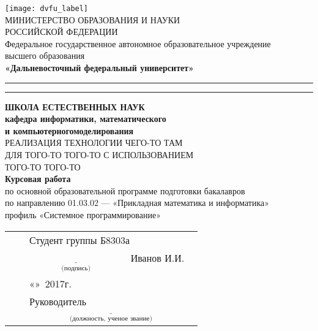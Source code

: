\hfill
\begin{center}
  \hfill \break
  \texttt{[image: dvfu\_label]}\\
  \large{МИНИСТЕРСТВО ОБРАЗОВАНИЯ И НАУКИ}\\
  \large{РОССИЙСКОЙ ФЕДЕРАЦИИ}\\
  \normalsize{Федеральное государственное автономное образовательное учреждение}\\
  \normalsize{высшего образования}\\
  \normalsize{\textbf{«Дальневосточный федеральный университет»}}\\
  \hfill \break
  \rule[0.0cm]{1\linewidth}{0.1cm}
  \rule[0.6cm]{1\linewidth}{0.05cm}
  \hfill \break
  \normalsize{\textbf{ШКОЛА ЕСТЕСТВЕННЫХ НАУК}}\\
  \normalsize{\textbf{кафедра информатики, математического\\ и компьютерногомоделирования}}\\
  \hfill \break
  \hfill \break
  \large{РЕАЛИЗАЦИЯ ТЕХНОЛОГИИ ЧЕГО-ТО ТАМ}\\
  \large{ДЛЯ ТОГО-ТО ТОГО-ТО С ИСПОЛЬЗОВАНИЕМ}\\
  \large{ТОГО-ТО ТОГО-ТО}\\
  \hfill \break
  \hfill \break
  \large{\textbf{Курсовая работа}}\\
  \normalsize{по основной образовательной программе подготовки бакалавров\\
  по направлению 01.03.02 --- «Прикладная математика и информатика»\\
  профиль «Системное программирование»}\\
  \hfill \break
  \hfill \break
  \hfill \break
  \hfill \break
  \begin{tabular}{lcl}
    & & Студент группы Б8303а\\
    & & $\underset{\text{(подпись)}}{\underline{\hspace{4cm}}}$ \ Иванов И.И. \\
    & & «\underline{\hspace{1.25cm}}»\ \underline{\hspace{4cm}}2017г. \\
    & & Руководитель \\
    & & $\underset{\text{(должность, ученое звание)}}{\underline{\hspace{7cm}}}$ \\

\end{tabular}
\end{center}
